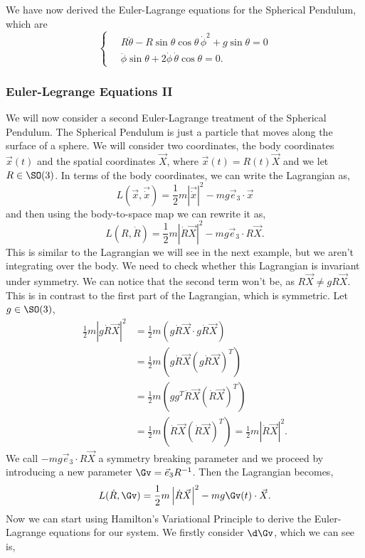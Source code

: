 We have now derived the Euler-Lagrange equations for the Spherical Pendulum, which are
$$ \begin{cases}
  \quad R\ddot{\theta} - R\sin \theta \cos \theta\,\dot \phi^2 + g\sin \theta = 0\\
  \quad\ddot\phi\sin \theta + 2\dot \phi\,\dot\theta\cos \theta = 0.
\end{cases} $$

\subsubsection{Euler-Legrange Equations II}
We will now consider a second Euler-Lagrange treatment of the Spherical Pendulum. The Spherical Pendulum is just a particle that moves along the surface of a sphere. We will consider two coordinates, the body coordinates $\vec x(t)$ and the spatial coordinates $\vec X$, where $\vec x(t) = R(t)\vec X$ and we let $R \in \SO(3)$. In terms of the body coordinates, we can write the Lagrangian as,
$$ L(\vec x, \vec{\dot x}) = \frac{1}{2}m\left|\vec{\dot x}\right|^2 - mg\vec e_3 \cdot \vec x $$
and then using the body-to-space map we can rewrite it as,
$$ L\left(R, {\dot R}\right) = \frac{1}{2}m\left|{\dot R\vec X}\right|^2 - mg\vec e_3 \cdot R\vec {X}. $$
This is similar to the Lagrangian we will see in the next example, but we aren't integrating over the body. We need to check whether this Lagrangian is invariant under symmetry. We can notice that the second term won't be, as $R\vec{X} \ne gR\vec{X}$. This is in contrast to the first part of the Lagrangian, which is symmetric. Let $g \in \SO(3)$,
\begin{align*}
  \frac{1}{2}m\left|{g\dot R \vec X}\right|^2 &= \frac{1}{2}m\left({g\dot R \vec X} \cdot {g\dot R \vec X}\right)\\
  &= \frac{1}{2}m\left({g\dot R \vec X} \left({g\dot R \vec X}\right)^T\right)\\
  &= \frac{1}{2}m\left({gg^T}{\dot R \vec X} \left({\dot R \vec X}\right)^T\right)\\
  &= \frac{1}{2}m\left({\dot R \vec X} \left({\dot R \vec X}\right)^T\right) = \frac{1}{2}m\left|{\dot R \vec X}\right|^2.
\end{align*}
We call $-mg\vec e_3 \cdot R\vec{X}$ a symmetry breaking parameter and we proceed by introducing a new parameter $\Gv = \vec e_3R^{-1}$. Then the Lagrangian becomes,
$$ L(\dot R, \Gv) = \frac{1}{2}m\left| \dot R\vec X \right|^2 - mg\Gv(t) \cdot \vec X. $$
Now we can start using Hamilton's Variational Principle to derive the Euler-Lagrange equations for our system. We firstly consider $\d\Gv$, which we can see is,
